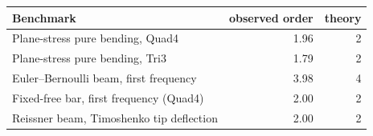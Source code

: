\begin{tabular}{lrr}
\toprule
Benchmark & observed order & theory \\
\midrule
Plane-stress pure bending, Quad4 & 1.96 & 2 \\
Plane-stress pure bending, Tri3 & 1.79 & 2 \\
Euler--Bernoulli beam, first frequency & 3.98 & 4 \\
Fixed-free bar, first frequency (Quad4) & 2.00 & 2 \\
Reissner beam, Timoshenko tip deflection & 2.00 & 2 \\
\bottomrule
\end{tabular}
